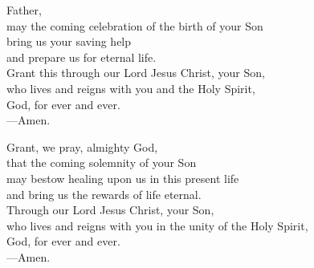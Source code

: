 \prayer


\begin{prayerverse}
Father,\\
may the coming celebration of the birth of your Son\\
bring us your saving help\\
and prepare us for eternal life.\\
Grant this through our Lord Jesus Christ, your Son,\\
who lives and reigns with you and the Holy Spirit,\\
God, for ever and ever.\\
{\color{red}---\thinspace}Amen.
\end{prayerverse}


\begin{prayerverse}
Grant, we pray, almighty God,\\
that the coming solemnity of your Son\\
may bestow healing upon us in this present life\\
and bring us the rewards of life eternal.\\
Through our Lord Jesus Christ, your Son,\\
who lives and reigns with you in the unity of the Holy Spirit,\\
God, for ever and ever.\\
{\color{red}---\thinspace}Amen.
\end{prayerverse}

